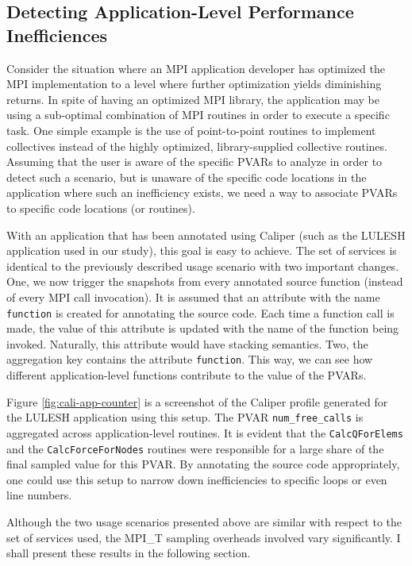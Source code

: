 \subsection{Detecting Application-Level Performance Inefficiences}
Consider the situation where an MPI application developer has optimized the MPI implementation to a level where further optimization yields diminishing returns. In spite of having an optimized MPI library, the application may be using a sub-optimal combination of MPI routines in order to execute a specific task. One simple example is the use of point-to-point routines to implement collectives instead of the highly optimized, library-supplied collective routines. Assuming that the user is aware of the specific PVARs to analyze in order to detect such a scenario, but is unaware of the specific code locations in the application where such an inefficiency exists, we need a way to associate PVARs to specific code locations (or routines).
\par With an application that has been annotated using Caliper (such as the LULESH application used in our study), this goal is easy to achieve. The set of services is identical to the previously described usage scenario with two important changes. One, we now trigger the snapshots from every annotated source function (instead of every MPI call invocation). It is assumed that an attribute with the name \verb+function+ is created for annotating the source code. Each time a function call is made, the value of this attribute is updated with the name of the function being invoked. Naturally, this attribute would have stacking semantics. Two, the aggregation key contains the attribute \verb+function+. This way, we can see how different application-level functions contribute to the value of the PVARs. 
\par Figure \ref{fig:cali-app-counter} is a screenshot of the Caliper profile generated for the LULESH application using this setup. The PVAR \verb+num_free_calls+ is aggregated across application-level routines. It is evident that the \verb+CalcQForElems+ and the \verb+CalcForceForNodes+ routines were responsible for a large share of the final sampled value for this PVAR. By annotating the source code appropriately, one could use this setup to narrow down inefficiencies to specific loops or even line numbers.
\par Although the two usage scenarios presented above are similar with respect to the set of services used, the MPI\_T sampling overheads involved vary significantly. I shall present these results in the following section.
